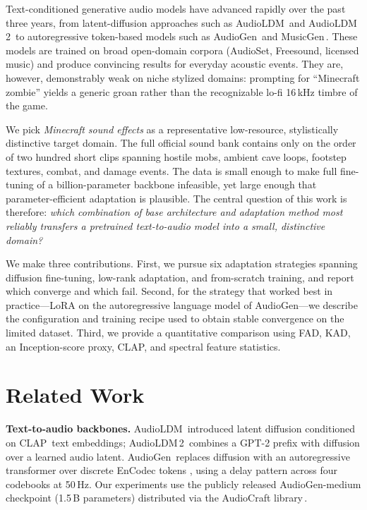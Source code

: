 \documentclass[conference]{IEEEtran}
\begin{document}
Text-conditioned generative audio models have advanced rapidly over the
past three years, from latent-diffusion approaches such as
AudioLDM\,\cite{liu2023audioldm} and AudioLDM\,2\,\cite{liu2024audioldm2}
to autoregressive token-based models such as
AudioGen\,\cite{kreuk2023audiogen} and MusicGen\,\cite{copet2024simple}.
These models are trained on broad open-domain corpora (AudioSet, Freesound,
licensed music) and produce convincing results for everyday acoustic
events. They are, however, demonstrably weak on niche stylized domains:
prompting for ``Minecraft zombie'' yields a generic groan rather than the
recognizable lo-fi 16\,kHz timbre of the game.

We pick \textit{Minecraft sound effects} as a representative low-resource,
stylistically distinctive target domain. The full official sound bank
contains only on the order of two hundred short clips spanning hostile
mobs, ambient cave loops, footstep textures, combat, and damage events.
The data is small enough to make full fine-tuning of a billion-parameter
backbone infeasible, yet large enough that parameter-efficient adaptation
is plausible. The central question of this work is therefore: \emph{which
combination of base architecture and adaptation method most reliably
transfers a pretrained text-to-audio model into a small, distinctive
domain?}

We make three contributions. First, we pursue six adaptation strategies
spanning diffusion fine-tuning, low-rank adaptation, and from-scratch
training, and report which converge and which fail. Second, for the
strategy that worked best in practice---LoRA on the autoregressive
language model of AudioGen---we describe the configuration and training
recipe used to obtain stable convergence on the limited dataset. Third,
we provide a quantitative comparison using FAD, KAD, an Inception-score
proxy, CLAP, and spectral feature statistics.

\section{Related Work}

\textbf{Text-to-audio backbones.}
AudioLDM\,\cite{liu2023audioldm} introduced latent diffusion conditioned on
CLAP\,\cite{wu2023clap} text embeddings; AudioLDM\,2\,\cite{liu2024audioldm2}
combines a GPT-2 prefix with diffusion over a learned audio latent.
AudioGen\,\cite{kreuk2023audiogen} replaces diffusion with an
autoregressive transformer over discrete EnCodec tokens
\cite{defossez2023encodec}, using a delay pattern across four codebooks
at 50\,Hz. Our experiments use the publicly released AudioGen-medium
checkpoint (1.5\,B parameters) distributed via the AudioCraft
library\,\cite{audiocraft2023}.
\end{document}
